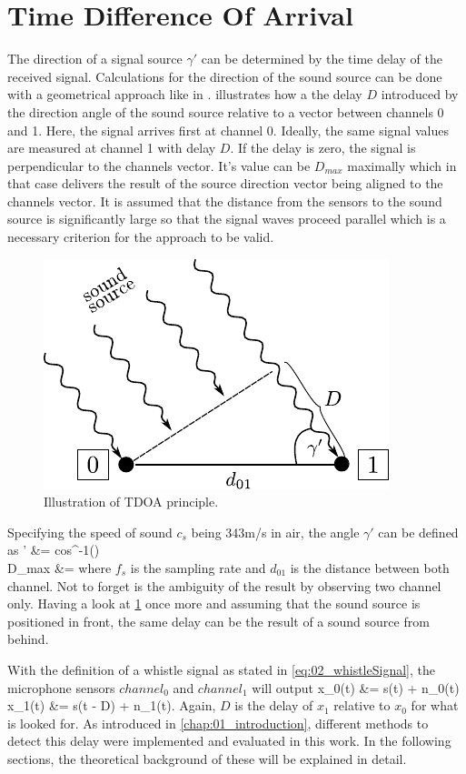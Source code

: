 \section{Time Difference Of Arrival}
\label{sec:02_tdoa}

The direction of a signal source $\gamma'$ can be determined by the time
delay of the received signal.
Calculations for the direction of the sound source can be done with a
geometrical approach like in \cite{Valin_Michaud}.
 illustrates how a the delay $D$ introduced by the direction angle
of the sound source relative to a vector between channels 0 and 1.
Here, the signal arrives first at channel 0. Ideally, the same signal values
are measured at channel 1 with delay $D$.
If the delay is zero, the signal is perpendicular to the channels vector.
It's value can be $D_{max}$ maximally which in that case delivers the
result of the source direction vector being aligned to the channels vector.
It is assumed that the distance from the sensors to the sound source is
significantly large so that the signal waves proceed parallel which is a necessary
criterion for the approach to be valid.
\begin{figure}[ht]
	\centering
		\includegraphics[width=0.4\columnwidth]{figures/tdoa_waves}
	\caption{Illustration of TDOA principle.}
    \label{fig:02_tdoa}
\end{figure}

Specifying the speed of sound $c_s$ being 343\si{m/s} in air, the angle
$\gamma'$ can be defined as
\bsub \bal
    \gamma' &= cos^{-1}()
    \label{eq:02_tdoaAngle}\\
    D_{max} &= 
\eal \esub
where $f_s$ is the sampling rate and $d_{01}$ is the distance between both channel.
Not to forget is the ambiguity of the result by observing two channel only.
Having a look at \cref{fig:02_tdoa} once more and assuming that the sound source
is positioned in front, the same delay can be the result of a sound source from behind.


With the definition of a whistle signal as stated in \cref{eq:02_whistleSignal},
the microphone sensors $channel_0$ and $channel_1$ will output
\bsub
\label{eq:02_signalTimeDomain}
\bal
    x_0(t) &= s(t) + n_0(t)\\
    x_1(t) &= \alpha s(t - D) + n_1(t).
\eal \esub
Again, $D$ is the delay of $x_1$ relative to $x_0$ for what is looked for.
As introduced in \cref{chap:01_introduction}, different methods to detect this delay
were implemented and evaluated in this work.
In the following sections, the theoretical background of these will be
explained in detail.